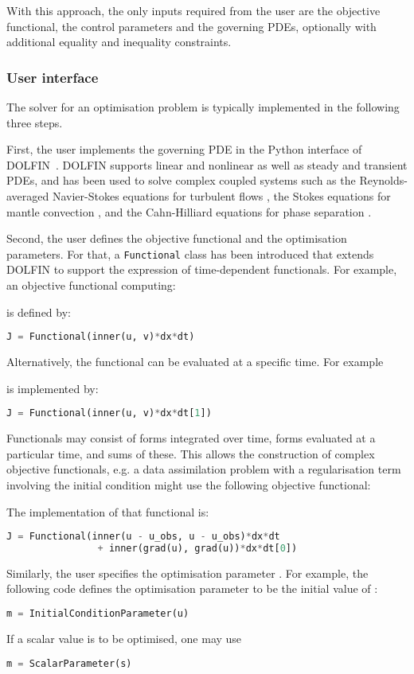 \documentclass[prodmode,acmtoms]{acmsmall}
\newcommand{\dolfin}{{\mbox{DOLFIN}}\xspace}
\begin{document}
With this approach, the only inputs required from the user are the objective functional, the control parameters and the governing PDEs,
optionally with additional equality and inequality constraints.

\subsubsection{User interface}
The solver for an optimisation problem is typically implemented in the following three steps.

First, the user implements the governing PDE in the Python interface of \dolfin~\cite{logg2011}.
\dolfin supports linear and nonlinear as well as steady and transient PDEs, and has been used to solve complex coupled systems such
as the Reynolds-averaged Navier-Stokes equations for turbulent flows \cite{mortensen2011}, the Stokes equations for mantle convection \cite{vynnytska2013}, and
the Cahn-Hilliard equations for phase separation \cite{wells2006}.

Second, the user defines the objective functional and the optimisation parameters.
For that, a \texttt{Functional} class has been introduced that extends \dolfin to support the expression of time-dependent functionals.
For example, an objective functional computing:
 
 is defined by: 
\begin{lstlisting}[language=Python,numbers=none]
J = Functional(inner(u, v)*dx*dt)
\end{lstlisting}
Alternatively, the functional can be evaluated at a specific time. For example  

is implemented by: 
\begin{lstlisting}[language=Python,numbers=none]
J = Functional(inner(u, v)*dx*dt[1])
\end{lstlisting}
Functionals may consist of forms integrated over time, forms evaluated at a particular time, and sums of these. 
This allows the construction of complex objective functionals, e.g. a data assimilation problem with a regularisation term involving the initial condition might use the following objective functional:

The implementation of that functional is:
\begin{lstlisting}[language=Python,numbers=none]
  J = Functional(inner(u - u_obs, u - u_obs)*dx*dt 
                + inner(grad(u), grad(u))*dx*dt[0]) 
\end{lstlisting}
Similarly, the user specifies the optimisation parameter . 
For example, the following code defines the optimisation parameter to be the initial value of : 
\begin{lstlisting}[language=Python,numbers=none]
      m = InitialConditionParameter(u)
\end{lstlisting}
If a scalar value  is to be optimised, one may use
\begin{lstlisting}[language=Python,numbers=none]
      m = ScalarParameter(s)
\end{lstlisting}
\end{document}
